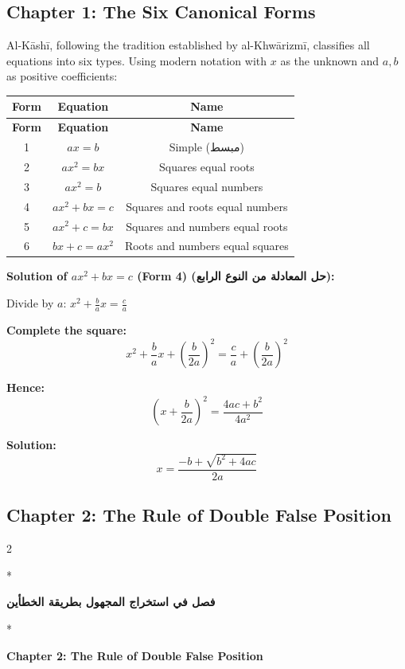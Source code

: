 \documentclass[11pt,a4paper]{article}
\newcommand{\ar}[1]{\arabicfont\beginR #1\endR}
\newenvironment{bilingual}{%
  \vspace{0.3em}%
  \begin{paracol}{2}%
}{%
  \end{paracol}%
  \vspace{0.3em}%
}
\newenvironment{mathalgo}{%
  \par\vspace{0.3cm}
  \begin{framed}
  \setlength{\parindent}{0pt}
}{%
  \end{framed}
  \par\vspace{0.3cm}
}
\begin{document}
\subsection{Chapter 1: The Six Canonical Forms}

Al-K\=ash\=i, following the tradition established by al-Khw\=arizm\=i,
classifies all equations into six types. Using modern notation with $x$
as the unknown and $a, b$ as positive coefficients:

\begin{longtable}{|c|c|c|}
\hline
\textbf{Form} & \textbf{Equation} & \textbf{Name} \\
\hline
\endfirsthead
\hline
\textbf{Form} & \textbf{Equation} & \textbf{Name} \\
\hline
\endhead
1 & $ax = b$ & Simple (\ar{مبسط}) \\
\hline
2 & $ax^2 = bx$ & Squares equal roots \\
\hline
3 & $ax^2 = b$ & Squares equal numbers \\
\hline
4 & $ax^2 + bx = c$ & Squares and roots equal numbers \\
\hline
5 & $ax^2 + c = bx$ & Squares and numbers equal roots \\
\hline
6 & $bx + c = ax^2$ & Roots and numbers equal squares \\
\hline
\end{longtable}

\begin{mathalgo}
\textbf{Solution of $ax^2 + bx = c$ (Form 4) (\ar{حل المعادلة من النوع الرابع}):}

Divide by $a$: $x^2 + \frac{b}{a}x = \frac{c}{a}$

\textbf{Complete the square:}
\[
x^2 + \frac{b}{a}x + \left(\frac{b}{2a}\right)^2 = \frac{c}{a} +
\left(\frac{b}{2a}\right)^2
\]

\textbf{Hence:}
\[
\left(x + \frac{b}{2a}\right)^2 = \frac{4ac + b^2}{4a^2}
\]

\textbf{Solution:}
\[
x = \frac{-b + \sqrt{b^2 + 4ac}}{2a}
\]
\end{mathalgo}

\subsection{Chapter 2: The Rule of Double False Position}

\begin{bilingual}
\switchcolumn[0]*
\begin{center}
\textbf{\color{chapcolor}\ar{فصل في استخراج المجهول بطريقة الخطأين}}
\end{center}
\switchcolumn[1]*
\begin{center}
\textbf{\color{chapcolor}Chapter 2: The Rule of Double False Position}
\end{center}
\end{bilingual}
\end{document}

